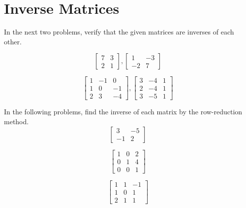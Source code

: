 \section{Inverse Matrices}

In the next two problems, verify that the given matrices are inverses of each other.

\begin{puzzle}
    \[
        \begin{bmatrix}
            7 & 3 \\
            2 & 1
        \end{bmatrix},
        \begin{bmatrix}
            1  & -3 \\
            -2 & 7
        \end{bmatrix}
    \]
\end{puzzle}

\begin{puzzle}
    \[
        \begin{bmatrix}
            1 & -1 & 0  \\
            1 & 0  & -1 \\
            2 & 3  & -4
        \end{bmatrix},
        \begin{bmatrix}
            3 & -4 & 1 \\
            2 & -4 & 1 \\
            3 & -5 & 1
        \end{bmatrix}
    \]
\end{puzzle}

\begin{puzzle}
    In the following problems, find the inverse of each matrix by the row-reduction method.
    \[
        \begin{bmatrix}
            3  & -5 \\
            -1 & 2
        \end{bmatrix}
    \]
\end{puzzle}

\begin{puzzle}
    \[
        \begin{bmatrix}
            1 & 0 & 2 \\
            0 & 1 & 4 \\
            0 & 0 & 1
        \end{bmatrix}
    \]
\end{puzzle}

\begin{puzzle}
    \[
        \begin{bmatrix}
            1 & 1 & -1 \\
            1 & 0 & 1  \\
            2 & 1 & 1
        \end{bmatrix}
    \]
\end{puzzle}

